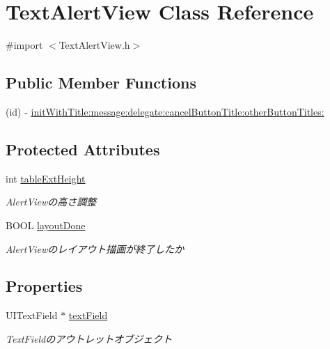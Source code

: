 \hypertarget{interface_text_alert_view}{
\section{TextAlertView Class Reference}
\label{interface_text_alert_view}
}


{\ttfamily \#import $<$TextAlertView.h$>$}

\subsection*{Public Member Functions}
\begin{DoxyCompactItemize}
\item 
(id) -\/ \hyperlink{interface_text_alert_view_a258d1de3963d12f8f8be71cd554b59fc}{initWithTitle:message:delegate:cancelButtonTitle:otherButtonTitles:}
\end{DoxyCompactItemize}
\subsection*{Protected Attributes}
\begin{DoxyCompactItemize}
\item 
\hypertarget{interface_text_alert_view_a7a2fe6109b41d98c957933207bbe3b21}{
int \hyperlink{interface_text_alert_view_a7a2fe6109b41d98c957933207bbe3b21}{tableExtHeight}}
\label{interface_text_alert_view_a7a2fe6109b41d98c957933207bbe3b21}

\begin{DoxyCompactList}\small\item\em AlertViewの高さ調整 \end{DoxyCompactList}\item 
\hypertarget{interface_text_alert_view_a5facf7c2d58edfbe9f87de62525958d7}{
BOOL \hyperlink{interface_text_alert_view_a5facf7c2d58edfbe9f87de62525958d7}{layoutDone}}
\label{interface_text_alert_view_a5facf7c2d58edfbe9f87de62525958d7}

\begin{DoxyCompactList}\small\item\em AlertViewのレイアウト描画が終了したか \end{DoxyCompactList}\end{DoxyCompactItemize}
\subsection*{Properties}
\begin{DoxyCompactItemize}
\item 
\hypertarget{interface_text_alert_view_a466338b8508aa5d97a1f2d8b39f1768e}{
UITextField $\ast$ \hyperlink{interface_text_alert_view_a466338b8508aa5d97a1f2d8b39f1768e}{textField}}
\label{interface_text_alert_view_a466338b8508aa5d97a1f2d8b39f1768e}

\begin{DoxyCompactList}\small\item\em TextFieldのアウトレットオブジェクト \end{DoxyCompactList}\end{DoxyCompactItemize}


